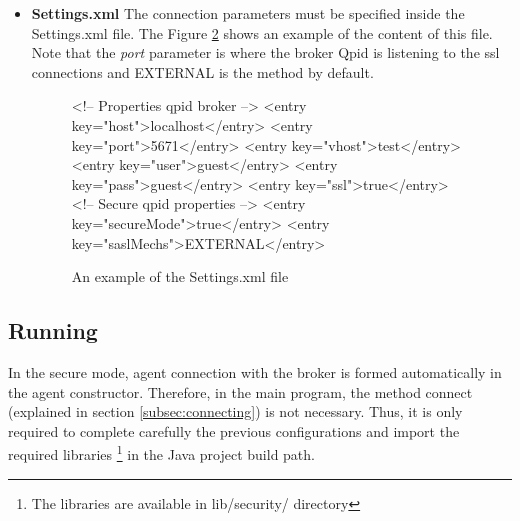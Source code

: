 \begin{itemize}
The alias will be displayed in the first place of line, for example in the following case the alias is \textit{alice} (Figure \ref{fig:keytoolRes}).

\begin{figure}[h!]
\begin{codigo}
Keystore type: JKS
Keystore provider: SUN

Your keystore contains 5 entries

alice, 27-sep-2010, PrivateKeyEntry, 
Hash of certificate (MD5): 
 13:D2:8F:3A:F3:2B:C9:D9:CC:6B:A8:C0:DB:7D:DA:FA
\end{codigo}
\caption{Result of the \textit{Keytool} command}
\label{fig:keytoolRes}
\end{figure}

\newpage

\item \textbf{Settings.xml}
The connection parameters must be specified inside the Settings.xml file. The Figure \ref{fig:settingsxmlfile} shows an example of the content of this file. Note that the \textit{port} parameter is where the broker Qpid is listening to the ssl connections and EXTERNAL is the method by default.


\begin{figure}
\begin{codigo}
    <!-- Properties qpid broker -->
    <entry key="host">localhost</entry>
    <entry key="port">5671</entry>
    <entry key="vhost">test</entry>
    <entry key="user">guest</entry>
    <entry key="pass">guest</entry>
    <entry key="ssl">true</entry>
    <!-- Secure qpid properties -->
    <entry key="secureMode">true</entry>
    <entry key="saslMechs">EXTERNAL</entry>
\end{codigo}
\caption{An example of the Settings.xml file}
\label{fig:settingsxmlfile}
\end{figure}


\end{itemize}

\subsection{Running}

In the secure mode, agent connection with the broker is formed automatically in the agent constructor. Therefore, in the main program, the 
method connect (explained in section \ref{subsec:connecting}) is not necessary. Thus, it is only required to complete carefully the previous configurations
and import the required libraries \footnote{The libraries are available in lib/security/ directory} in the Java project build path.


